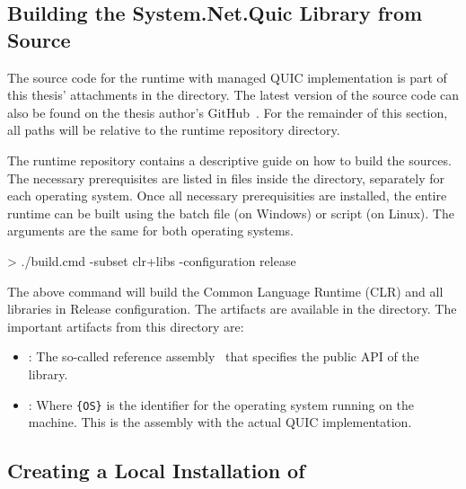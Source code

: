 \subsection{Building the System.Net.Quic Library from Source}\label{sec:06-build-runtime}

The source code for the \dotnet{} runtime with managed QUIC implementation is part of this thesis'
attachments in the  directory. The latest version of the source code
can also be found on the thesis author's GitHub~\cite{githubRzikmRuntimelab}. For the remainder of
this section, all paths will be relative to the \dotnet{} runtime repository directory.

The \dotnet{} runtime repository contains a descriptive guide on how to build the sources. The
necessary prerequisites are listed in files inside the 
directory, separately for each operating system. Once all necessary prerequisities are installed,
the entire \dotnet{} runtime can be built using the  batch file (on Windows) or
 script (on Linux). The arguments are the same for both operating systems.

\begin{myVerbatim}
> ./build.cmd -subset clr+libs -configuration release
\end{myVerbatim}

The above command will build the Common Language Runtime (CLR) and all libraries in Release
configuration. The artifacts are available in the 
directory. The important artifacts from this directory are:

\begin{itemize}

  \item {}: The so-called reference
assembly~\cite{ReferenceAssemblyDocs} that specifies the public API of the library.

  \item {}: Where \verb|{OS}| is the identifier for
the operating system running on the machine. This is the \dotnet{} assembly with the actual QUIC
implementation.

\end{itemize}

\subsection{Creating a Local Installation of \dotnet{}}\label{sec:06localdotnet}


